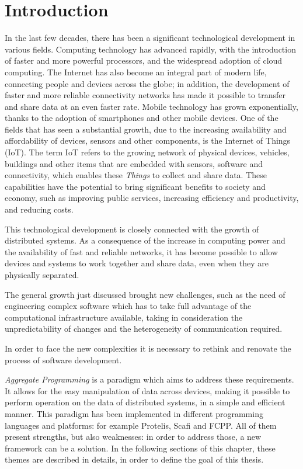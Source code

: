 \chapter{Introduction}\label{chapter:introduction}
In the last few decades, there has been a significant technological development in various fields.
Computing technology has advanced rapidly, with the introduction of faster and more powerful processors, and the widespread adoption of cloud computing.\newline
The Internet has also become an integral part of modern life, connecting people and devices across the globe; in addition, the development of faster and more reliable connectivity networks has made it possible to transfer and share data at an even faster rate.\newline
Mobile technology has grown exponentially, thanks to the adoption of smartphones and other mobile devices.\newline
One of the fields that has seen a substantial growth, due to the increasing availability and affordability of devices, sensors and other components, is the Internet of Things (IoT). The term IoT refers to the growing network of physical devices, vehicles, buildings and other items that are embedded with sensors, software and connectivity, which enables these \textit{Things} to collect and share data. These capabilities have the potential to bring significant benefits to society and economy, such as improving public services, increasing efficiency and productivity, and reducing costs.

This technological development is closely connected with the growth of distributed systems. As a consequence of the increase in computing power and the availability of fast and reliable networks, it has become possible to allow devices and systems to work together and share data, even when they are physically separated.

The general growth just discussed brought new challenges, such as the need of engineering complex software which has to take full advantage of the computational infrastructure available, taking in consideration the unpredictability of changes and the heterogeneity of communication required.

In order to face the new complexities it is necessary to rethink and renovate the process of software development.

\textit{Aggregate Programming} is a paradigm which aims to address these requirements. It allows for the easy manipulation of data across devices, making it possible to perform operation on the data of distributed systems, in a simple and efficient manner.\newline
This paradigm has been implemented in different programming languages and platforms: for example Protelis, Scafi and FCPP.\newline
All of them present strengths, but also weaknesses: in order to address those, a new framework can be a solution.\newline
In the following sections of this chapter, these themes are described in details, in order to define the goal of this thesis.

